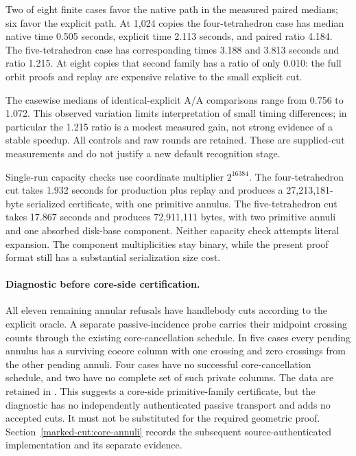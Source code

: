 

Two of eight finite cases favor the native path in the measured paired
medians; six favor the explicit path. At 1,024 copies the four-tetrahedron
case has median native time 0.505 seconds, explicit time 2.113 seconds, and
paired ratio 4.184. The five-tetrahedron case has corresponding times
3.188 and 3.813 seconds and ratio 1.215. At eight copies that second family
has a ratio of only 0.010: the full orbit proofs and replay are expensive
relative to the small explicit cut.

The casewise medians of identical-explicit A/A comparisons range from 0.756
to 1.072. This observed variation limits interpretation of small timing
differences; in particular the 1.215 ratio is a modest measured gain, not
strong evidence of a stable speedup. All controls and raw rounds are retained. These are
supplied-cut measurements and do not justify a new default recognition stage.

Single-run capacity checks use coordinate multiplier $2^{16384}$. The
four-tetrahedron cut takes 1.932 seconds for production plus replay and
produces a 27,213,181-byte serialized certificate, with one primitive annulus.
The five-tetrahedron cut takes 17.867 seconds and produces 72,911,111 bytes,
with two primitive annuli and one absorbed disk-base component. Neither
capacity check attempts literal expansion. The component multiplicities stay
binary, while the present proof format still has a substantial serialization
size cost.

\paragraph{Diagnostic before core-side certification.}
All eleven remaining annular refusals have handlebody cuts according to the
explicit oracle. A separate passive-incidence probe carries their midpoint
crossing counts through the existing core-cancellation schedule. In five
cases every pending annulus has a surviving cocore column with one crossing
and zero crossings from the other pending annuli. Four cases have no successful
core-cancellation schedule, and two have no complete set of such private
columns. The data are retained in .
This suggests a core-side primitive-family certificate, but the diagnostic
has no independently authenticated passive transport and adds no accepted
cuts. It must not be substituted for the required geometric proof.
Section~\ref{marked-cut:core-annuli} records the subsequent source-authenticated
implementation and its separate evidence.
